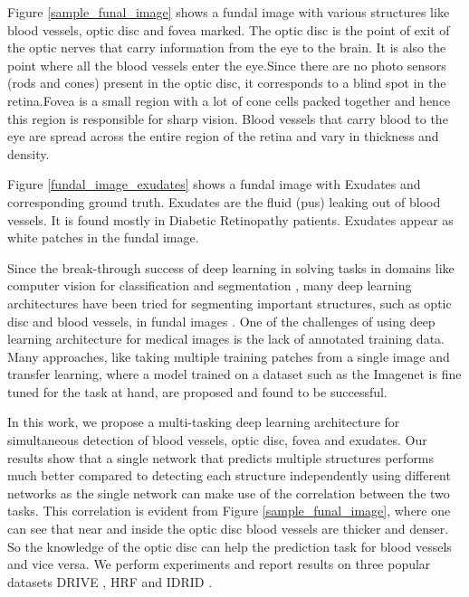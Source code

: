 \documentclass{article}
\begin{document}
Figure \ref{sample_funal_image} shows a fundal image with various structures like blood vessels, optic disc and fovea marked. The optic disc is the point of exit of the optic nerves that carry information from the eye to the brain. It is also the point where all the blood vessels enter the eye.Since there are no photo sensors (rods and cones) present in the optic disc, it corresponds to a blind spot in the retina.Fovea is a small region with a lot of cone cells packed together and hence this region is responsible for sharp vision. Blood vessels that carry blood to the eye are spread across the entire region of the retina and vary in thickness and density.

Figure \ref{fundal_image_exudates} shows a fundal image with Exudates and corresponding ground truth. Exudates are the fluid (pus) leaking out of blood vessels. It is found mostly in Diabetic Retinopathy patients. Exudates appear as white patches in the fundal image.

Since the break-through success of deep learning in solving tasks in domains like computer vision for classification \cite{krizhevsky2012imagenet} \cite{simonyan2014very} and segmentation \cite{chen2017deeplab}, many deep learning architectures have been tried for segmenting important structures, such as optic disc and blood vessels, in fundal images \cite {vengalil2016customizing} \cite{zhuang2018laddernet} \cite{jiang2018retinal} \cite{park2020m}. One of the challenges of using deep learning architecture for medical images is the lack of annotated training data. Many approaches, like taking multiple training patches from  a single image \cite{vengalil2016customizing} and transfer learning, where a model trained on a dataset such as the Imagenet \cite{deng2009imagenet} is fine tuned for the task at hand, are proposed and found to be successful.

In this work, we propose a multi-tasking deep learning architecture for simultaneous detection of blood vessels, optic disc, fovea and exudates. Our results show that a single network that predicts multiple structures  performs much better compared to detecting  each structure independently using different networks as the single network can make use of the correlation between the two tasks. This correlation is evident from Figure \ref{sample_funal_image}, where one can see that near and inside the optic disc blood vessels are thicker and denser. So the knowledge of the optic disc can help the prediction task for blood vessels and vice versa. We perform experiments and report results on three popular datasets DRIVE \cite{drive}, HRF \cite{budai2013robust} and IDRID \cite{h25w98-18}.
\end{document}
